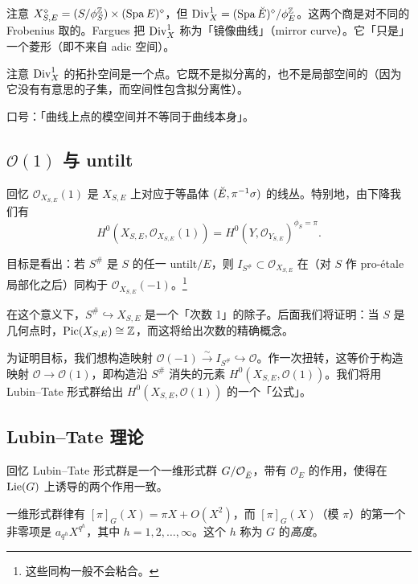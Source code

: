 \begin{warning}
注意 $X^{\diamond}_{S,E} = (S/\phi_S^{\mathbb Z}) \times (\operatorname{Spa} E)^{\diamond}$，但 $\mathrm{Div}^1_X = (\operatorname{Spa} \breve{E})^{\diamond}/\phi_E^{\mathbb Z}$。这两个商是对不同的 Frobenius 取的。Fargues 把 $\mathrm{Div}^1_X$ 称为「镜像曲线」（mirror curve）。它「只是」一个菱形（即不来自 adic 空间）。

注意 $\mathrm{Div}^1_X$ 的拓扑空间是一个点。它既不是拟分离的，也不是局部空间的（因为它没有有意思的子集，而空间性包含拟分离性）。

口号：「曲线上点的模空间并不等同于曲线本身」。
\end{warning}

\subsection{$\mathcal O(1)$ 与 untilt}

回忆 $\mathcal O_{X_{S,E}}(1)$ 是 $X_{S,E}$ 上对应于等晶体 $(\breve{E},\pi^{-1}\sigma)$ 的线丛。特别地，由下降我们有
\[
  H^0(X_{S,E},\mathcal O_{X_{S,E}}(1)) = H^0(Y,\mathcal O_{Y_{S,E}})^{\phi_S=\pi}.
\]

目标是看出：若 $S^{\#}$ 是 $S$ 的任一 untilt$/E$，则 $I_{S^{\#}} \subset \mathcal O_{X_{S,E}}$ 在（对 $S$ 作 pro-étale 局部化之后）同构于 $\mathcal O_{X_{S,E}}(-1)$。\footnote{这些同构一般不会粘合。}

\begin{remark}
在这个意义下，$S^{\#} \hookrightarrow X_{S,E}$ 是一个「次数 1」的除子。后面我们将证明：当 $S$ 是几何点时，$\operatorname{Pic}(X_{S,E}) \cong \mathbb Z$，而这将给出次数的精确概念。
\end{remark}

为证明目标，我们想构造映射 $\mathcal O(-1) \xrightarrow{\sim} I_{S^{\#}} \hookrightarrow \mathcal O$。作一次扭转，这等价于构造映射 $\mathcal O \to \mathcal O(1)$，即构造沿 $S^{\#}$ 消失的元素 $H^0(X_{S,E},\mathcal O(1))$。我们将用 Lubin–Tate 形式群给出 $H^0(X_{S,E},\mathcal O(1))$ 的一个「公式」。

\subsection{Lubin–Tate 理论}

回忆 Lubin–Tate 形式群是一个一维形式群 $G/\mathcal O_{\breve{E}}$，带有 $\mathcal O_E$ 的作用，使得在 $\operatorname{Lie}(G)$ 上诱导的两个作用一致。

一维形式群律有 $[\pi]_G(X) = \pi X + O(X^2)$，而 $[\pi]_G(X)$（模 $\pi$）的第一个非零项是 $a_{q^h}X^{q^h}$，其中 $h = 1,2,\dots,\infty$。这个 $h$ 称为 $G$ 的\emph{高度}。


